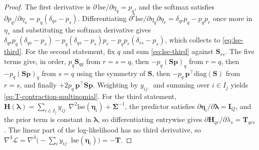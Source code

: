 \begin{proof}
The first derivative is $\partial\,\mathrm{lse}/\partial\eta_{q}=p_{q}$, and the softmax satisfies $\partial p_{q}/\partial\eta_{s}=p_{q}(\delta_{qs}-p_{s})$. Differentiating $\partial^{2}\mathrm{lse}/\partial\eta_{q}\partial\eta_{r}=\delta_{qr}p_{q}-p_{q}p_{r}$ once more in $\eta_{s}$ and substituting the softmax derivative gives $\delta_{qr}p_{q}(\delta_{qs}-p_{s})-p_{q}(\delta_{qs}-p_{s})p_{r}-p_{q}p_{r}(\delta_{rs}-p_{s})$, which collects to \eqref{eq:lse-third}. For the second statement, fix $q$ and sum \eqref{eq:lse-third} against $\mathbf{S}_{rs}$. The five terms give, in order, $p_{q}\mathbf{S}_{qq}$ from $r=s=q$, then $-p_{q}(\mathbf{S}\bm{p})_{q}$ from $r=q$, then $-p_{q}(\mathbf{S}\bm{p})_{q}$ from $s=q$ using the symmetry of $\mathbf{S}$, then $-p_{q}\,\bm{p}^{\top}\mathrm{diag}(\mathbf{S})$ from $r=s$, and finally $+2p_{q}\,\bm{p}^{\top}\mathbf{S}\bm{p}$. Weighting by $y_{ij\cdot}$ and summing over $i\in I_{j}$ yields \eqref{eq:T-contraction-multinomial}. For the third statement, $\mathbf{H}(\bm{\lambda})=\sum_{i\in I_{j}}y_{ij\cdot}\nabla^{2}\mathrm{lse}(\bm{\eta}_{i})+\bm{\Sigma}^{-1}$, the predictor satisfies $\partial\bm{\eta}_{i}/\partial\bm{\lambda}=\mathbf{I}_{Q}$, and the prior term is constant in $\bm{\lambda}$, so differentiating entrywise gives $\partial\mathbf{H}_{qr}/\partial\lambda_{s}=\mathbf{T}_{qrs}$. The linear part of the log-likelihood has no third derivative, so $\nabla^{3}\mathcal{L}=\nabla^{3}\big(-\sum_{i}y_{ij\cdot}\,\mathrm{lse}(\bm{\eta}_{i})\big)=-\mathbf{T}$.
\end{proof}

